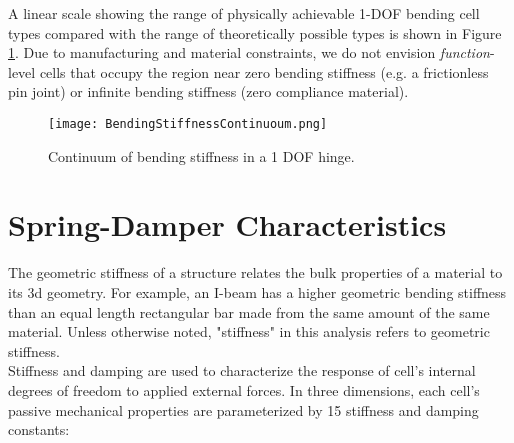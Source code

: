 {A linear scale showing the range of physically achievable 1-DOF bending cell types compared with the range of theoretically possible types is shown in Figure \ref{fig:BendingStiffnessContinuoum}.  Due to manufacturing and material constraints, we do not envision \textit{function}-level cells that occupy the region near zero bending stiffness (e.g. a frictionless pin joint) or infinite bending stiffness (zero compliance material).

\begin{figure}
  \texttt{[image: BendingStiffnessContinuoum.png]}
  \caption{Continuum of bending stiffness in a 1 DOF hinge.}
  \label{fig:BendingStiffnessContinuoum}
\end{figure}

\section{Spring-Damper Characteristics}

The geometric stiffness of a structure relates the bulk properties of a material to its 3d geometry.  For example, an I-beam has a higher geometric bending stiffness than an equal length rectangular bar made from the same amount of the same material.  Unless otherwise noted, "stiffness" in this analysis refers to geometric stiffness.\\

Stiffness and damping are used to characterize the response of cell's internal degrees of freedom to applied external forces.  In three dimensions, each cell's passive mechanical properties are parameterized by 15 stiffness and damping constants:

}
